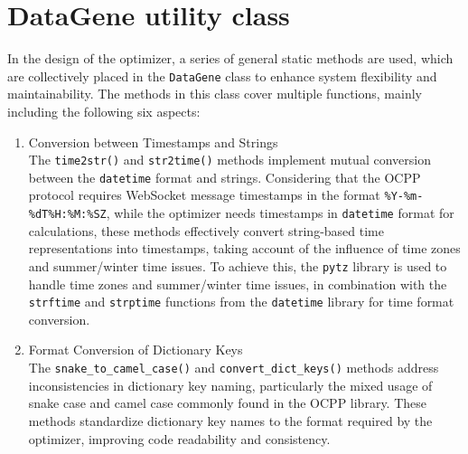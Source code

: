 \documentclass[
	english,
	ruledheaders=section,%
	class=report,%
	thesis={type=Report},%
	accentcolor=9c,%
	custommargins=true,%
	marginpar=false,%
	parskip=half-,%
	fontsize=11pt,%
	logofile={img/tuda_logo.pdf}, %
]{tudapub}
\begin{document}
\section{DataGene utility class}
\label{sec:DataGene}
In the design of the optimizer, a series of general static methods are used, which are collectively placed in the \texttt{DataGene} class to enhance system flexibility and maintainability. The methods in this class cover multiple functions, mainly including the following six aspects:
\begin{enumerate}

    \item Conversion between Timestamps and Strings\\
    The \texttt{time2str()} and \texttt{str2time()} methods implement mutual conversion between the \texttt{datetime} format and strings. Considering that the \ac{OCPP} protocol requires WebSocket message timestamps in the format \texttt{\%Y-\%m-\%dT\%H:\%M:\%SZ}, while the optimizer needs timestamps in \texttt{datetime} format for calculations, these methods effectively convert string-based time representations into timestamps, taking account of the influence of time zones and summer/winter time issues. To achieve this, the \texttt{pytz} library is used to handle time zones and summer/winter time issues, in combination with the \texttt{strftime} and \texttt{strptime} functions from the \texttt{datetime} library for time format conversion.



    \item Format Conversion of Dictionary Keys\\
    The \texttt{snake\_to\_camel\_case()} and \texttt{convert\_dict\_keys()} methods address inconsistencies in dictionary key naming, particularly the mixed usage of snake case and camel case commonly found in the \ac{OCPP} library. These methods standardize dictionary key names to the format required by the optimizer, improving code readability and consistency.


\end{enumerate}
\end{document}
